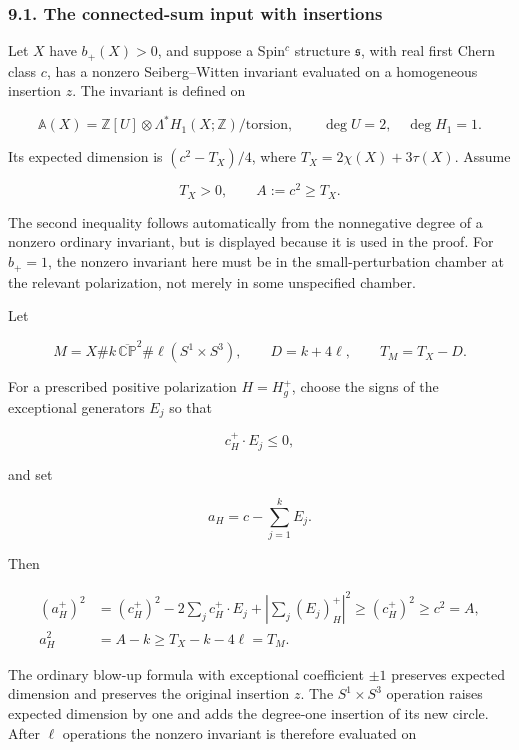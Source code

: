 \documentclass[
  11pt,
]{article}
\begin{document}
\hypertarget{the-connected-sum-input-with-insertions}{%
\subsubsection{9.1. The connected-sum input with
insertions}\label{the-connected-sum-input-with-insertions}}

Let \(X\) have \(b_+(X)>0\), and suppose a Spin\(^c\) structure
\(\mathfrak s\), with real first Chern class \(c\), has a nonzero
Seiberg--Witten invariant evaluated on a homogeneous insertion \(z\).
The invariant is defined on

\[
 \mathbb A(X)=\mathbb Z[U]\otimes\Lambda^*H_1(X;\mathbb Z)/\mathrm{torsion},
                 \qquad\deg U=2,\quad\deg H_1=1.
\]

Its expected dimension is \((c^2-T_X)/4\), where
\(T_X=2\chi(X)+3\tau(X)\). Assume

\[
                    T_X>0,\qquad A:=c^2\ge T_X.          \tag{9.2}
\]

The second inequality follows automatically from the nonnegative degree
of a nonzero ordinary invariant, but is displayed because it is used in
the proof. For \(b_+=1\), the nonzero invariant here must be in the
small-perturbation chamber at the relevant polarization, not merely in
some unspecified chamber.

Let

\[
 M=X\#k\,\overline{\mathbb{CP}}^{2}\#\ell(S^1\times S^3),
 \qquad D=k+4\ell,\qquad T_M=T_X-D.                      \tag{9.3}
\]

For a prescribed positive polarization \(H=H_g^+\), choose the signs of
the exceptional generators \(E_j\) so that

\[
                         c_H^+\mathbin\cdot E_j\le0,
\]

and set

\[
                             a_H=c-\sum_{j=1}^kE_j.
 \tag{9.4}
\]

Then

\[
 \begin{split}
 (a_H^+)^2
   &=(c_H^+)^2-2\sum_jc_H^+\mathbin\cdot E_j
                              +\left|\sum_j(E_j)_H^+\right|^2
      \ge(c_H^+)^2\ge c^2=A,\\
 a_H^2&=A-k\ge T_X-k-4\ell=T_M.
 \end{split}                                              \tag{9.5}
\]

The ordinary blow-up formula with exceptional coefficient \(\pm1\)
preserves expected dimension and preserves the original insertion \(z\).
The \(S^1\times S^3\) operation raises expected dimension by one and
adds the degree-one insertion of its new circle. After \(\ell\)
operations the nonzero invariant is therefore evaluated on
\end{document}
